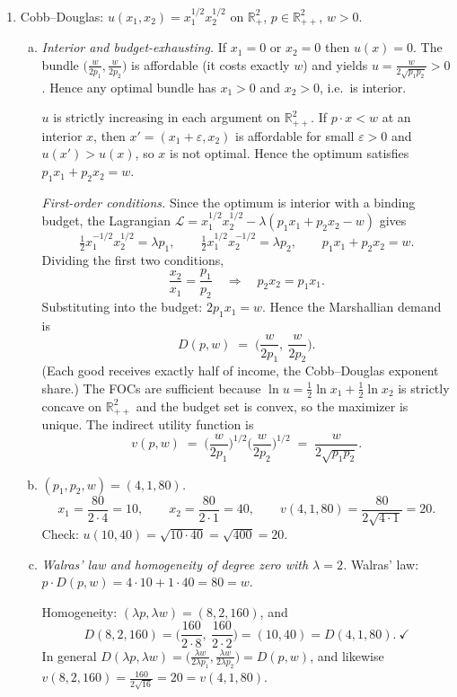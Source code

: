 \documentclass[12pt]{article}
\newcommand{\R}{\mathbb{R}}
\begin{document}
\begin{enumerate}
\item Cobb--Douglas: $u(x_1,x_2) = x_1^{1/2}x_2^{1/2}$ on $\R^2_+$, $p \in \R^2_{++}$, $w>0$.

\begin{enumerate}[(a)]
\item \emph{Interior and budget-exhausting.}
If $x_1 = 0$ or $x_2 = 0$ then $u(x) = 0$. The bundle $\big(\tfrac{w}{2p_1},\tfrac{w}{2p_2}\big)$ is affordable (it costs exactly $w$) and yields $u = \tfrac{w}{2\sqrt{p_1p_2}} > 0$. Hence any optimal bundle has $x_1>0$ and $x_2>0$, i.e.\ is interior.

$u$ is strictly increasing in each argument on $\R^2_{++}$. If $p\cdot x < w$ at an interior $x$, then $x' = (x_1+\varepsilon, x_2)$ is affordable for small $\varepsilon>0$ and $u(x')>u(x)$, so $x$ is not optimal. Hence the optimum satisfies $p_1x_1+p_2x_2 = w$.

\emph{First-order conditions.} Since the optimum is interior with a binding budget, the Lagrangian
$\mathcal{L} = x_1^{1/2}x_2^{1/2} - \lambda(p_1x_1+p_2x_2-w)$ gives
\[
\tfrac12 x_1^{-1/2}x_2^{1/2} = \lambda p_1, \qquad
\tfrac12 x_1^{1/2}x_2^{-1/2} = \lambda p_2, \qquad
p_1x_1+p_2x_2 = w.
\]
Dividing the first two conditions,
\[
\frac{x_2}{x_1} = \frac{p_1}{p_2} \quad\Longrightarrow\quad p_2 x_2 = p_1 x_1 .
\]
Substituting into the budget: $2p_1x_1 = w$. Hence the Marshallian demand is
\[
D(p,w) \;=\; \Big( \frac{w}{2p_1},\ \frac{w}{2p_2} \Big).
\]
(Each good receives exactly half of income, the Cobb--Douglas exponent share.) The FOCs are sufficient because $\ln u = \tfrac12\ln x_1 + \tfrac12 \ln x_2$ is strictly concave on $\R^2_{++}$ and the budget set is convex, so the maximizer is unique. The indirect utility function is
\[
v(p,w) \;=\; \Big(\frac{w}{2p_1}\Big)^{1/2}\Big(\frac{w}{2p_2}\Big)^{1/2} \;=\; \frac{w}{2\sqrt{p_1p_2}} .
\]

\item \emph{$(p_1,p_2,w) = (4,1,80)$.}
\[
x_1 = \frac{80}{2\cdot 4} = 10, \qquad x_2 = \frac{80}{2\cdot 1} = 40, \qquad
v(4,1,80) = \frac{80}{2\sqrt{4\cdot 1}} = 20 .
\]
Check: $u(10,40) = \sqrt{10\cdot 40} = \sqrt{400} = 20$.

\item \emph{Walras' law and homogeneity of degree zero with $\lambda = 2$.}
Walras' law: $p\cdot D(p,w) = 4\cdot 10 + 1 \cdot 40 = 80 = w$. \checkmark

Homogeneity: $(\lambda p, \lambda w) = (8, 2, 160)$, and
\[
D(8,2,160) = \Big(\frac{160}{2\cdot 8},\ \frac{160}{2\cdot 2}\Big) = (10,40) = D(4,1,80). \ \checkmark
\]
In general $D(\lambda p,\lambda w) = \big(\tfrac{\lambda w}{2\lambda p_1}, \tfrac{\lambda w}{2\lambda p_2}\big) = D(p,w)$, and likewise $v(8,2,160) = \tfrac{160}{2\sqrt{16}} = 20 = v(4,1,80)$.
\end{enumerate}


\end{enumerate}
\end{document}

